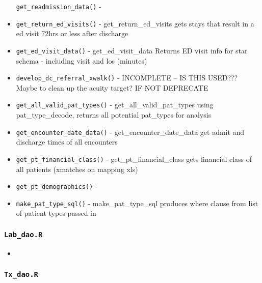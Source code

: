 \documentclass[
]{book}
\begin{document}
\begin{itemize}
  \texttt{get\_readmission\_data()} -
\item
  \texttt{get\_return\_ed\_visits()} - get\_return\_ed\_visits gets stays that result in a ed visit 72hrs or less after discharge
\item
  \texttt{get\_ed\_visit\_data()} - get\_ed\_visit\_data Returns ED visit info for star schema - including visit and los (minutes)
\item
  \texttt{develop\_dc\_referral\_xwalk()} - INCOMPLETE -- IS THIS USED??? Maybe to clean up the acuity target? IF NOT DEPRECATE
\item
  \texttt{get\_all\_valid\_pat\_types()} - get\_all\_valid\_pat\_types using pat\_type\_decode, returns all potential pat\_types for analysis
\item
  \texttt{get\_encounter\_date\_data()} - get\_encounter\_date\_data get admit and discharge times of all encounters
\item
  \texttt{get\_pt\_financial\_class()} - get\_pt\_financial\_class gets financial class of all patients (xmatches on mapping xls)
\item
  \texttt{get\_pt\_demographics()} -
\item
  \texttt{make\_pat\_type\_sql()} - make\_pat\_type\_sql produces where clause from list of patient types passed in
\end{itemize}

\hypertarget{lab_dao.r}{%
\subsubsection{\texorpdfstring{\texttt{Lab\_dao.R}}{Lab\_dao.R}}\label{lab_dao.r}}

\begin{itemize}
\item
\end{itemize}

\hypertarget{tx_dao.r}{%
\subsubsection{\texorpdfstring{\texttt{Tx\_dao.R}}{Tx\_dao.R}}\label{tx_dao.r}}
\end{document}
